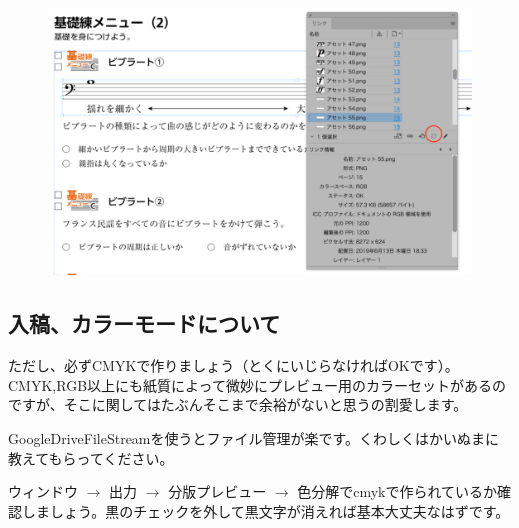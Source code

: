 \documentclass[dvipdfmx,jb5]{jarticle}
\begin{document}
\begin{figure}[H]
  \includegraphics[scale=0.7]{assets/pmh0.png}
\end{figure}

\subsection{入稿、カラーモードについて}
ただし、必ずCMYKで作りましょう（とくにいじらなければOKです）。CMYK,RGB以上にも紙質によって微妙にプレビュー用のカラーセットがあるのですが、そこに関してはたぶんそこまで余裕がないと思うの割愛します。

GoogleDriveFileStreamを使うとファイル管理が楽です。くわしくはかいぬまに教えてもらってください。

ウィンドウ $\rightarrow$ 出力 $\rightarrow$ 分版プレビュー $\rightarrow$ 色分解でcmykで作られているか確認しましょう。黒のチェックを外して黒文字が消えれば基本大丈夫なはずです。
\end{document}
